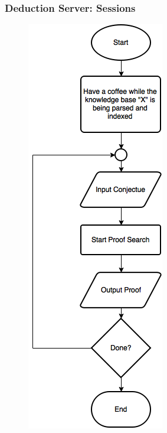 \documentclass[10pt]{beamer}
\begin{document}
\begin{frame}[fragile]
  \frametitle{Deduction Server: Sessions}
  \begin{figure} \includegraphics[width=\linewidth,height=0.9\textheight,keepaspectratio]{imgs/NewDeductionFC.png} \end{figure}
\end{frame}
\end{document}
